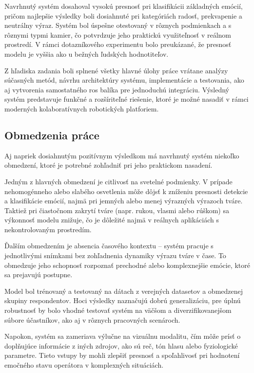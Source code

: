 Navrhnutý systém dosahoval vysokú presnosť pri klasifikácii základných emócií, pričom najlepšie výsledky boli dosiahnuté pri kategóriách radosť, prekvapenie a neutrálny výraz. Systém bol úspešne otestovaný v rôznych podmienkach a s rôznymi typmi kamier, čo potvrdzuje jeho praktickú využiteľnosť v reálnom prostredí. V rámci dotazníkového experimentu bolo preukázané, že presnosť modelu je vyššia ako u bežných ľudských hodnotiteľov.

Z hľadiska zadania boli splnené všetky hlavné úlohy práce vrátane analýzy súčasných metód, návrhu architektúry systému, implementácie a testovania, ako aj vytvorenia samostatného \gls{ros} balíka pre jednoduchú integráciu. Výsledný systém predstavuje funkčné a rozšíriteľné riešenie, ktoré je možné nasadiť v rámci moderných kolaboratívnych robotických platforiem.

\subsection{Obmedzenia práce}

Aj napriek dosiahnutým pozitívnym výsledkom má navrhnutý systém niekoľko obmedzení, ktoré je potrebné zohľadniť pri jeho praktickom nasadení.

Jedným z hlavných obmedzení je citlivosť na svetelné podmienky. V prípade nehomogénneho alebo slabého osvetlenia môže dôjsť k zníženiu presnosti detekcie a klasifikácie emócií, najmä pri jemných alebo menej výrazných výrazoch tváre. Taktiež pri čiastočnom zakrytí tváre (napr. rukou, vlasmi alebo rúškom) sa výkonnosť modelu znižuje, čo je dôležité najmä v reálnych aplikáciách s nekontrolovaným prostredím.

Ďalším obmedzením je absencia časového kontextu – systém pracuje s jednotlivými snímkami bez zohľadnenia dynamiky výrazu tváre v čase. To obmedzuje jeho schopnosť rozpoznať prechodné alebo komplexnejšie emócie, ktoré sa prejavujú postupne.

Model bol trénovaný a testovaný na dátach z verejných datasetov a obmedzenej skupiny respondentov. Hoci výsledky naznačujú dobrú generalizáciu, pre úplnú robustnosť by bolo vhodné testovať systém na väčšom a diverzifikovanejšom súbore účastníkov, ako aj v rôznych pracovných scenároch.

Napokon, systém sa zameriava výlučne na vizuálnu modalitu, čím môže prísť o doplňujúce informácie z iných zdrojov, ako sú reč, tón hlasu alebo fyziologické parametre. Tieto vstupy by mohli zlepšiť presnosť a spoľahlivosť pri hodnotení emočného stavu operátora v komplexných situáciách.

